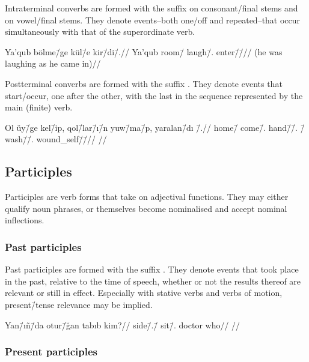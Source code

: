 Intraterminal converbs are formed with the suffix  on consonant\-/final stems and  on
vowel\-/final stems.
They denote events\---both one\-/off and repeated\---that occur simultaneously
with that of the superordinate verb.

\ex
  \begingl
    \gla Ya'qub bölme\=/ge kül\=/e kir\=/di\=/\zero.//
    \glb Ya'qub room\=/\Dat{} laugh\=/\Cvb.\Intra{} enter\=/\Pst\=/\Tsg//
    \glft{} (he was laughing as he came
    in)//
  \endgl
\xe

Postterminal converbs are formed with the suffix .
They denote events that start/occur, one after the other, with the last in the
sequence represented by the main (finite) verb.

\ex
  \begingl
    \gla Ol üy\=/ge kel\=/ip, qol\=/lar\=/ı\=/n yuw\=/ma\=/p, yaralan\=/dı%
    \=/\zero.//
    \glb \Tsg{} home\=/\Dat{} come\=/\Cvb.\Post{} hand\=/\Pl\=/\Poss.\Third%
    \=/\Acc{} wash\=/\Neg{}\=/\Cvb.\Post{} wound\_self\=/\Pst\=/\Tsg//
    \glft {}//
  \endgl
\xe

\subsection{Participles}

Participles are verb forms that take on adjectival functions.
They may either qualify noun phrases, or themselves become nominalised and
accept nominal inflections.

\subsubsection{Past participles}

Past participles are formed with the suffix .
They denote events that took place in the past, relative to the time of speech,
whether or not the results thereof are relevant or still in effect.
Especially with stative verbs and verbs of motion, present\=/tense relevance may
be implied.

\ex
  \begingl
    \gla Yan\=/ıñ\=/da otur\=/ğan tabıb kim?//
    \glb side\=/\Poss.\Ssg\=/\Loc{} sit\=/\Ptcp.\Pst{} doctor who//
    \glft {}//
  \endgl
\xe

\subsubsection{Present participles}

